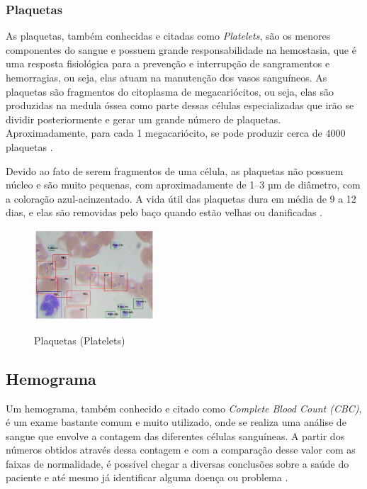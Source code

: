 \subsubsection{Plaquetas}
As plaquetas, também conhecidas e citadas como \emph{Platelets}, são os menores componentes do sangue e possuem grande responsabilidade na hemostasia, que é uma resposta fisiológica para a prevenção e interrupção de sangramentos e hemorragias, ou seja, elas atuam na manutenção dos vasos sanguíneos. As plaquetas são fragmentos do citoplasma de megacariócitos, ou seja, elas são produzidas na medula óssea como parte dessas células especializadas que irão se dividir posteriormente e gerar um grande número de plaquetas. Aproximadamente, para cada 1 megacariócito, se pode produzir cerca de 4000 plaquetas \cite{abcOfCbc}.

Devido ao fato de serem fragmentos de uma célula, as plaquetas não possuem núcleo e são muito pequenas, com aproximadamente de 1–3 µm de diâmetro, com a coloração azul-acinzentado. A vida útil das plaquetas dura em média de 9 a 12 dias, e elas são removidas pelo baço quando estão velhas ou danificadas \cite{abcOfCbc}.

\begin{figure}[!htb]
    \centering
    \caption{Plaquetas (Platelets)}
    \includegraphics[width=0.40\textwidth]{img/plt.jpg}
    \label{fig:plaquetas}
 \end{figure}
 
\subsection{Hemograma}
Um hemograma, também conhecido e citado como \emph{Complete Blood Count (CBC)}, é um exame bastante comum e muito utilizado, onde se realiza uma análise de sangue que envolve a contagem das diferentes células sanguíneas. A partir dos números obtidos através dessa contagem e com a comparação desse valor com as faixas de normalidade, é possível chegar a diversas conclusões sobre a saúde do paciente e até mesmo já identificar alguma doença ou problema \cite{manualHematologia, abcOfCbc}.

